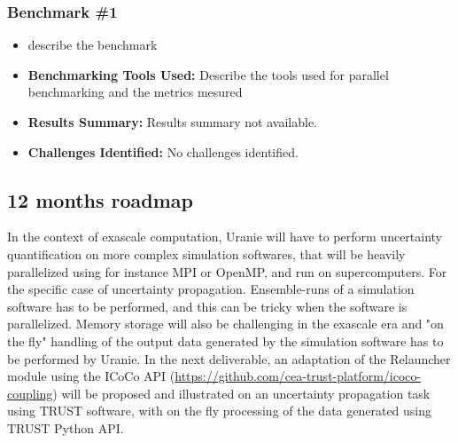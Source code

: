 \subsubsection{Benchmark \#1}
\begin{itemize}
    \item describe the benchmark
    \item \textbf{Benchmarking Tools Used:} Describe the tools used for parallel benchmarking and the metrics mesured
    \item \textbf{Results Summary:} Results summary not available.
    \item \textbf{Challenges Identified:} No challenges identified.
\end{itemize}

\subsection{12 months roadmap}
\label{sec:WP6:Uranie:roadmap}

In the context of exascale computation, Uranie will have to perform uncertainty quantification on more complex simulation softwares, that will be heavily parallelized using for instance MPI or OpenMP, and run on supercomputers. For the specific case of uncertainty propagation. Ensemble-runs of a simulation software has to be performed, and this can be tricky when the software is parallelized. Memory storage will also be challenging in the exascale era and "on the fly" handling of the output data generated by the simulation software has to be performed by Uranie. In the next deliverable, an adaptation of the Relauncher module using the ICoCo API (\url{https://github.com/cea-trust-platform/icoco-coupling}) will be proposed and illustrated on an uncertainty propagation task using TRUST software, with on the fly processing of the data generated using TRUST Python API.  
